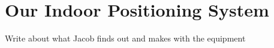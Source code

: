 \section{Our Indoor Positioning System}
Write about what Jacob finds out and makes with the equipment